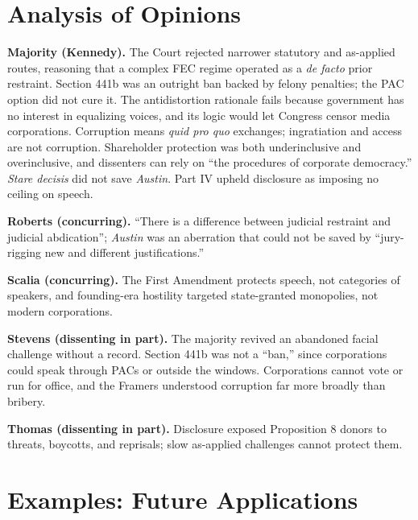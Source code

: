 \documentclass[12pt]{article}
\begin{document}
\section{Analysis of Opinions}

\textbf{Majority (Kennedy).} The Court rejected narrower statutory and as-applied routes, reasoning that a complex FEC regime operated as a \textit{de facto} prior restraint. Section 441b was an outright ban backed by felony penalties; the PAC option did not cure it. The antidistortion rationale fails because government has no interest in equalizing voices, and its logic would let Congress censor media corporations. Corruption means \textit{quid pro quo} exchanges; ingratiation and access are not corruption. Shareholder protection was both underinclusive and overinclusive, and dissenters can rely on ``the procedures of corporate democracy.'' \textit{Stare decisis} did not save \textit{Austin}. Part IV upheld disclosure as imposing no ceiling on speech.

\textbf{Roberts (concurring).} ``There is a difference between judicial restraint and judicial abdication''; \textit{Austin} was an aberration that could not be saved by ``jury-rigging new and different justifications.''

\textbf{Scalia (concurring).} The First Amendment protects speech, not categories of speakers, and founding-era hostility targeted state-granted monopolies, not modern corporations.

\textbf{Stevens (dissenting in part).} The majority revived an abandoned facial challenge without a record. Section 441b was not a ``ban,'' since corporations could speak through PACs or outside the windows. Corporations cannot vote or run for office, and the Framers understood corruption far more broadly than bribery.

\textbf{Thomas (dissenting in part).} Disclosure exposed Proposition 8 donors to threats, boycotts, and reprisals; slow as-applied challenges cannot protect them.

\section{Examples: Future Applications}
\end{document}
